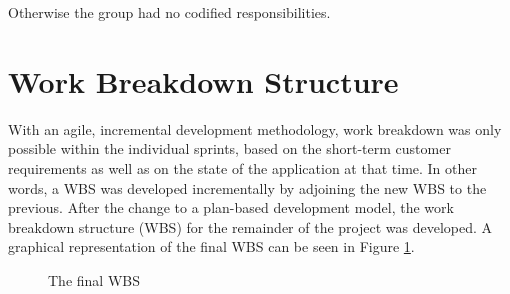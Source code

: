 Otherwise the group had no codified responsibilities.
 
\section{Work Breakdown Structure}
With an agile, incremental development methodology, work breakdown was only possible within the individual sprints, based on the short-term customer requirements as well as on the state of the application at that time. In other words, a WBS was developed incrementally by adjoining the new WBS to the previous. After the change to a plan-based development model, the work breakdown structure (WBS) for the remainder of the project was developed. A graphical representation of the final WBS can be seen in Figure \ref{fig:WBS}.

\begin{figure}[p]

\setlength\fboxsep{0pt}
\setlength\fboxrule{1pt}\noindent{}

\caption{The final WBS}
\label{fig:WBS}
\end{figure}
